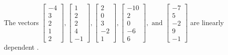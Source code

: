 \begin{exercise}
\begin{exerciseStatement}
  \end{exerciseStatement}
  \begin{exerciseAnswer}
   The vectors \(\left[\begin{array}{r}
-4 \\
3 \\
2 \\
1 \\
2
\end{array}\right] , \left[\begin{array}{r}
1 \\
2 \\
2 \\
4 \\
-1
\end{array}\right] , \left[\begin{array}{r}
2 \\
0 \\
3 \\
-2 \\
1
\end{array}\right] , \left[\begin{array}{r}
-10 \\
2 \\
0 \\
-6 \\
6
\end{array}\right] , \text{ and } \left[\begin{array}{r}
-7 \\
5 \\
-2 \\
9 \\
-1
\end{array}\right]\) are 
  	 linearly dependent  .
  


  \end{exerciseAnswer}
\end{exercise}